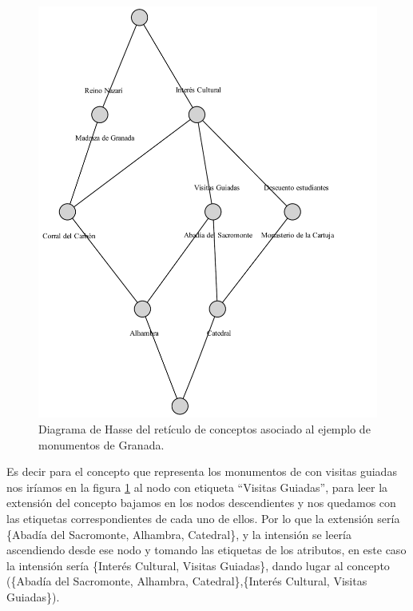 \documentclass[oneside,openright,titlepage,numbers=noenddot,openany,headinclude,footinclude=true,
cleardoublepage=empty,abstractoff,BCOR=5mm,paper=a4,fontsize=12pt,main=spanish]{scrreprt}
\begin{document}
\begin{figure}[H]
\begin{center}
\includegraphics[scale=0.7]{images/graphviz(2).pdf}
\caption{Diagrama de Hasse del retículo de conceptos asociado al ejemplo de monumentos de Granada.}
\label{diagramamonuments}
\end{center}
\end{figure}


Es decir para el concepto que representa los monumentos de con visitas guiadas nos iríamos en la figura \ref{diagramamonuments} al nodo con etiqueta ``Visitas Guiadas'', para leer la extensión del concepto bajamos en los nodos descendientes y nos quedamos con las etiquetas correspondientes de cada uno de ellos. Por lo que la extensión sería \{Abadía del Sacromonte, Alhambra, Catedral\}, y la intensión se leería ascendiendo desde ese nodo y tomando las etiquetas de los atributos, en este caso la intensión sería \{Interés Cultural, Visitas Guiadas\}, dando lugar al concepto (\{Abadía del Sacromonte, Alhambra, Catedral\},\{Interés Cultural, Visitas Guiadas\}).
\end{document}
